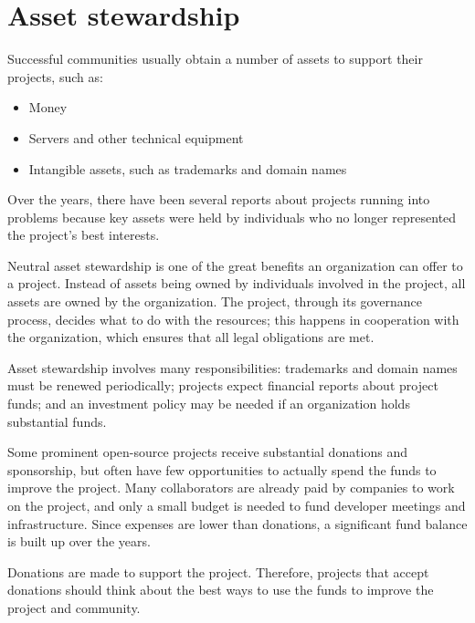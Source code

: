 


\chapter{Asset stewardship}

Successful communities usually obtain a number of assets to support their projects, such as:

\begin{itemize}

\item Money

\item Servers and other technical equipment

\item Intangible assets, such as trademarks and domain names

\end{itemize}

Over the years, there have been several reports about projects running into problems because key assets were held by individuals who no longer represented the project's best interests.

Neutral asset stewardship is one of the great benefits an organization can offer to a project.  Instead of assets being owned by individuals involved in the project, all assets are owned by the organization.  The project, through its governance process, decides what to do with the resources; this happens in cooperation with the organization, which ensures that all legal obligations are met.

Asset stewardship involves many responsibilities: trademarks and domain names must be renewed periodically; projects expect financial reports about project funds; and an investment policy may be needed if an organization holds substantial funds.

\begin{kaobox}[frametitle=Projects with big balances]

Some prominent open-source projects receive substantial donations and sponsorship, but often have few opportunities to actually spend the funds to improve the project.  Many collaborators are already paid by companies to work on the project, and only a small budget is needed to fund developer meetings and infrastructure.  Since expenses are lower than donations, a significant fund balance is built up over the years.

Donations are made to support the project.  Therefore, projects that accept donations should think about the best ways to use the funds to improve the project and community.

\end{kaobox}

